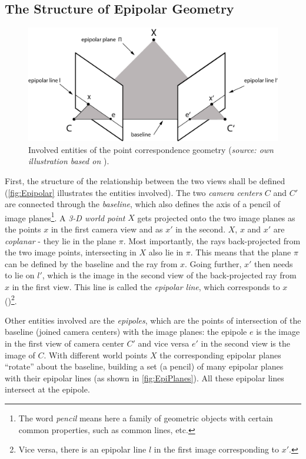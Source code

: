 \subsection{The Structure of Epipolar Geometry}
\begin{figure}[htbp]
		\centering
		\includegraphics[width=1.0\textwidth]{figures/EpipolarGeometry}
		\caption[Involved entities of the point correspondence geometry]{Involved entities of the point correspondence geometry (\textit{source: own illustration based on} \cite[p.240]{Hartley.2011}).}
		\label{fig:Epipolar}
\end{figure}

First, the structure of the relationship between the two views shall be defined (\autoref{fig:Epipolar} illustrates the entities involved). The two \textit{camera centers} $C$ and $C'$ are connected through the \textit{baseline}, which also defines the axis of a pencil of image planes\footnote{The word \textit{pencil} means here a family of geometric objects with certain common properties, such as common lines, etc.}. A \textit{3-D world point} $X$ gets projected onto the two image planes as the points $x$ in the first camera view and as $x'$ in the second.  $X$, $x$ and $x'$ are \textit{coplanar} - they lie in the plane $\pi$. Most importantly, the rays back-projected from the two image points, intersecting in $X$ also lie in $\pi$. This means that the plane $\pi$ can be defined by the baseline and the ray from $x$. Going further, $x'$ then needs to lie on $l'$, which is the image in the second view of the back-projected ray from $x$ in the first view. This line is called the \textit{epipolar line}, which corresponds to $x$ (\cite[p.239 et seq.]{Hartley.2011})\footnote{Vice versa, there is an epipolar line $l$ in the first image corresponding to $x'$.}.

Other entities involved are the \textit{epipoles}, which are the points of intersection of the baseline (joined camera centers) with the image planes: the epipole $e$ is the image in the first view of camera center $C'$ and vice versa $e'$ in the second view is the image of $C$. With different world points $X$ the corresponding epipolar planes \enquote{rotate} about the baseline, building a set (a pencil) of many epipolar planes with their epipolar lines (as shown in \autoref{fig:EpiPlanes}). All these epipolar lines intersect at the epipole.

